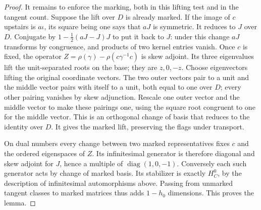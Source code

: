 \documentclass[a4paper,11pt]{article}
\theoremstyle{definition}
\theoremstyle{remark}
\numberwithin{equation}{section}
\begin{document}
\begin{proof}
It remains to enforce the marking, both in this lifting test
and in the tangent count. Suppose the lift over \(D\) is already
marked. If the image of \(c\) upstairs is \(a\iota\), its square
being one says that \(aJ\) is symmetric. It reduces to \(J\)
over \(D\). Conjugate by \(1-\tfrac12(aJ-J)J\) to put it back
to \(J\): under this change \(aJ\) transforms by congruence,
and products of two kernel entries vanish. Once \(c\) is fixed,
the operator \(Z=\rho(\gamma)-\rho(c\gamma^{-1}c)\) is skew
adjoint. Its three eigenvalues lift the unit-separated roots
on the base; they are \(z,0,-z\). Choose eigenvectors lifting
the original coordinate vectors. The two outer vectors pair to
a unit and the middle vector pairs with itself to a unit, both
equal to one over \(D\); every other pairing vanishes by skew
adjunction. Rescale one outer vector and the middle vector to
make these pairings one, using the square root congruent to one
for the middle vector. This is an orthogonal change of basis
that reduces to the identity over \(D\). It gives the marked
lift, preserving the flags under transport.

On dual numbers every change between two marked representatives
fixes \(c\) and the ordered eigenspaces of \(Z\). Its infinitesimal
generator is therefore diagonal and skew adjoint for \(J\), hence
a multiple of \(\operatorname{diag}(1,0,-1)\). Conversely each
such generator acts by change of marked basis. Its stabilizer is
exactly \(H_C^0\), by the description of infinitesimal automorphisms
above. Passing from unmarked tangent classes to marked matrices
thus adds \(1-h_0\) dimensions. This proves the lemma.
\end{proof}
\end{document}
